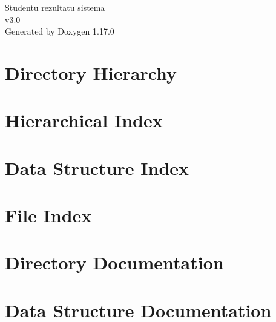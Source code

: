\documentclass[twoside]{book}
\newcommand{\+}{\discretionary{\mbox{\scriptsize$\hookleftarrow$}}{}{}}
\newcommand{\clearemptydoublepage}{%
    \newpage{\pagestyle{empty}\cleardoublepage}%
  }
\begin{document}
  \raggedbottom
    \hypersetup{pageanchor=false,
                bookmarksnumbered=true,
                pdfencoding=unicode
               }
  \begin{titlepage}
  \vspace*{7cm}
  \begin{center}%
  {\Large Studentu rezultatu sistema}\\
  [1ex]\large v3.\+0 \\
  \vspace*{1cm}
  {\large Generated by Doxygen 1.17.0}\\
  \end{center}
  \end{titlepage}
  \clearemptydoublepage
  \tableofcontents
  \clearemptydoublepage
  \hypersetup{pageanchor=true}
\chapter{Directory Hierarchy}

\chapter{Hierarchical Index}

\chapter{Data Structure Index}

\chapter{File Index}

\chapter{Directory Documentation}

\chapter{Data Structure Documentation}





\end{document}
